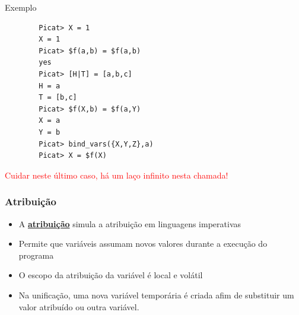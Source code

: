 
\begin{frame}[fragile]
	
	\begin{block}{Exemplo}
		
		\begin{verbatim}
		Picat> X = 1
		X = 1
		Picat> $f(a,b) = $f(a,b)
		yes
		Picat> [H|T] = [a,b,c]
		H = a
		T = [b,c]
		Picat> $f(X,b) = $f(a,Y)
		X = a
		Y = b
		Picat> bind_vars({X,Y,Z},a)
		Picat> X = $f(X)
		\end{verbatim}
	
	\textcolor{red}{Cuidar neste último caso, há um laço infinito nesta chamada!}	
		
	\end{block}
	
\end{frame}

\begin{frame}[fragile]
	\frametitle{Atribuição}
	
	\begin{itemize}
		
		\item A \textbf{\underline{atribuição}}  simula a atribuição em
		linguagens imperativas
		
		\pause
		\item Permite que variáveis assumam novos valores durante a execução
		do programa
		
				\pause
		\item O escopo da atribuição da variável é local e volátil
		
				\pause
		\item Na unificação,  uma nova variável temporária é criada 
		afim de substituir um valor	atribuído ou outra variável.
		
		
	\end{itemize}
	
\end{frame}



